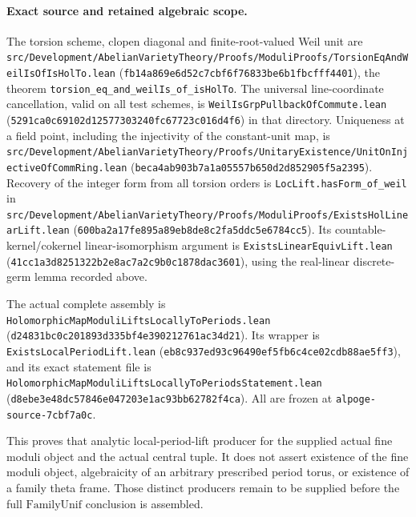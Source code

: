 \paragraph{Exact source and retained algebraic scope.}
The torsion scheme, clopen diagonal and finite-root-valued
Weil unit are
\texttt{src/Development/AbelianVarietyTheory/Proofs/ModuliProofs/TorsionEqAndWeilIsOfIsHolTo.lean}
(\texttt{fb14a869e6d52c7cbf6f76833be6b1fbcfff4401}),
the theorem
\texttt{torsion_eq_and_weilIs_of_isHolTo}.
The universal line-coordinate cancellation, valid on all
test schemes, is
\texttt{WeilIsGrpPullbackOfCommute.lean}
(\texttt{5291ca0c69102d12577303240fc67723c016d4f6})
in that directory.
Uniqueness at a field point, including the injectivity
of the constant-unit map, is
\texttt{src/Development/AbelianVarietyTheory/Proofs/UnitaryExistence/UnitOnInjectiveOfCommRing.lean}
(\texttt{beca4ab903b7a1a05557b650d2d852905f5a2395}).
Recovery of the integer form from all torsion orders is
\texttt{LocLift.hasForm_of_weil} in
\texttt{src/Development/AbelianVarietyTheory/Proofs/ModuliProofs/ExistsHolLinearLift.lean}
(\texttt{600ba2a17fe895a89eb8de8c2fa5ddc5e6784cc5}).
Its countable-kernel/cokernel linear-isomorphism argument
is \texttt{ExistsLinearEquivLift.lean}
(\texttt{41cc1a3d8251322b2e8ac7a2c9b0c1878dac3601}),
using the real-linear discrete-germ lemma recorded above.

The actual complete assembly is
\texttt{HolomorphicMapModuliLiftsLocallyToPeriods.lean}
(\texttt{d24831bc0c201893d335bf4e390212761ac34d21}).
Its wrapper is \texttt{ExistsLocalPeriodLift.lean}
(\texttt{eb8c937ed93c96490ef5fb6c4ce02cdb88ae5ff3}),
and its exact statement file is
\texttt{HolomorphicMapModuliLiftsLocallyToPeriodsStatement.lean}
(\texttt{d8ebe3e48dc57846e047203e1ac93bb62782f4ca}).
All are frozen at \texttt{alpoge-source-7cbf7a0c}.

This proves that analytic local-period-lift producer for
the supplied actual fine moduli object and the actual
central tuple.
It does not assert existence of the fine moduli object,
algebraicity of an arbitrary prescribed period torus,
or existence of a family theta frame.
Those distinct producers remain to be supplied before
the full \(\mathrm{FamilyUnif}\) conclusion is assembled.
